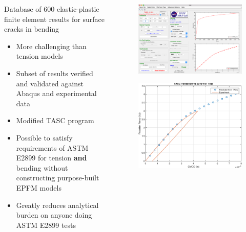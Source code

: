 \begin{frame}
\begin{columns}
\begin{column}{0.6\textwidth}
Database of 600 elastic-plastic finite element results for surface cracks in bending
\begin{itemize}
\item More challenging than tension models
\item Subset of results verified and validated against Abaqus and experimental data
\item Modified TASC program
\item Possible to satisfy requirements of ASTM E2899 for tension {\bfseries and} bending without constructing purpose-built EPFM models
\item Greatly reduces analytical burden on anyone doing ASTM E2899 tests
\end{itemize}
\end{column}
\begin{column}{0.3\textwidth}
\begin{figure}[tbp]
\centering
\includegraphics[width=0.8\columnwidth]{tasc-force-cmod-validation}
\end{figure}
\begin{figure}[tbp]
\centering
\includegraphics[width=0.75\columnwidth]{experimental-validation}
\end{figure}
\end{column}
\end{columns}
\note{
\vfill
}
\end{frame}

